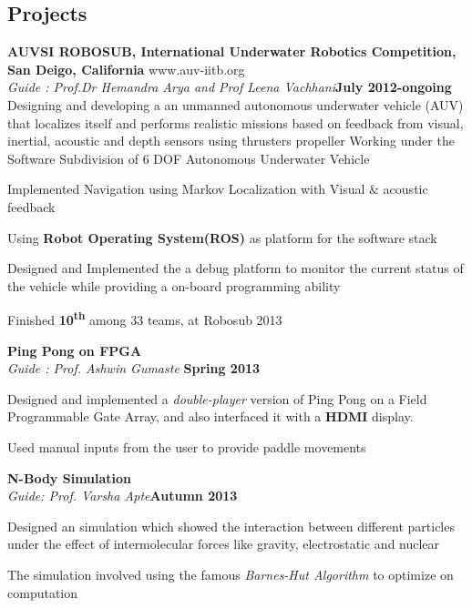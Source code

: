 \documentclass[margin,11pt]{resume}
\begin{document}
\begin{resume}
				\section{\mysidestyle Projects}
\textbf{AUVSI ROBOSUB, International Underwater Robotics Competition, San Deigo, California } \hfill www.auv-iitb.org
\vspace{1mm}\\ 
					\textsl{Guide : Prof.Dr Hemandra Arya and Prof Leena Vachhani}\hfill \textbf{July 2012-ongoing}\\Designing and developing a an unmanned autonomous underwater vehicle (AUV) that localizes itself and performs 	realistic missions based on feedback from visual, inertial, acoustic and depth sensors 	using thrusters\/ propeller
				Working under the Software Subdivision of 6 DOF Autonomous Underwater Vehicle 
				\begin{list2} 
				\item Implemented Navigation using Markov Localization with Visual \& acoustic feedback
				\item Using \textbf{Robot Operating System(ROS)} as platform for the software stack
				\item Designed and Implemented the a debug platform to monitor the current status of the vehicle while providing a on-board programming ability
				\item Finished \textbf{10\textsuperscript{th}} among 33 teams, at Robosub 2013\vspace{-2.75mm} 
				\end{list2}
\textbf{Ping Pong on FPGA}\vspace{1mm} \hfill\\
\textsl{Guide : Prof. Ashwin Gumaste} \hfill \textbf{Spring 2013} \vspace{-4mm}\\ 
		 \begin{list2}
		 \item Designed and implemented a \emph{double-player} version of Ping Pong on a Field Programmable Gate Array, and also interfaced it with a \textbf{HDMI} display.				\item  Used manual inputs from the user to provide paddle movements
				\end{list2}
\vspace{-2.75mm} 

\textbf{N-Body Simulation}\vspace{1mm} \hfill\\ 
\textsl{Guide: Prof. Varsha Apte}\hfill \textbf{Autumn 2013}\vspace{-5mm}\\
				\begin{list2}	
				\item Designed an simulation which showed the interaction between different particles under the effect of intermolecular forces like gravity, electrostatic and nuclear
				\item The simulation involved using the famous \emph{Barnes-Hut Algorithm} to optimize on computation
				\end{list2}\vspace{-2.75mm} 


\end{resume}
\end{document}
